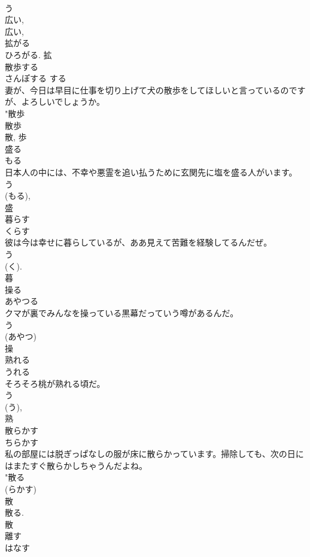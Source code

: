 \documentclass[8pt]{extreport}
\begin{document}
\begin{CJK}{UTF8}{min}
\\	う 
\\	広い, 
\\	広い, 
\\	拡がる 
\\	ひろがる.	拡	
\\	散歩する	
\\	さんぽする	する 
\\	妻が、今日は早目に仕事を切り上げて犬の散歩をしてほしいと言っているのですが、よろしいでしょうか。	
\\	"散歩 
\\	散歩 
\\	散, 歩	
\\	盛る	
\\	もる	
\\	日本人の中には、不幸や悪霊を追い払うために玄関先に塩を盛る人がいます。	
\\	う 
\\	(もる), 
\\	盛	
\\	暮らす	
\\	くらす	
\\	彼は今は幸せに暮らしているが、ああ見えて苦難を経験してるんだぜ。	
\\	う 
\\	(く). 
\\	暮	
\\	操る	
\\	あやつる	
\\	クマが裏でみんなを操っている黒幕だっていう噂があるんだ。	
\\	う 
\\	(あやつ) 
\\	操	
\\	熟れる	
\\	うれる	
\\	そろそろ桃が熟れる頃だ。	
\\	う 
\\	(う), 
\\	熟	
\\	散らかす	
\\	ちらかす	
\\	私の部屋には脱ぎっぱなしの服が床に散らかっています。掃除しても、次の日にはまたすぐ散らかしちゃうんだよね。	
\\	"散る 
\\	(らかす) 
\\	散 
\\	散る. 
\\	散	
\\	離す	
\\	はなす	

\end{CJK}
\end{document}
